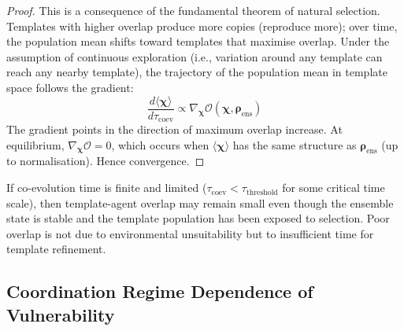 \documentclass[11pt,twocolumn,a4paper]{article}
\newcommand{\Template}{\boldsymbol{\chi}}
\newcommand{\State}{\boldsymbol{\rho}}
\newcommand{\Overlap}{\mathcal{O}}
\begin{document}
\begin{proof}
This is a consequence of the fundamental theorem of natural selection. Templates with higher overlap produce more copies (reproduce more); over time, the population mean shifts toward templates that maximise overlap. Under the assumption of continuous exploration (i.e., variation around any template can reach any nearby template), the trajectory of the population mean in template space follows the gradient:
\begin{equation}
\frac{d\langle \Template \rangle}{d\tau_{\mathrm{coev}}} \propto \nabla_{\Template} \Overlap(\Template, \State_{\mathrm{ens}})
\label{eq:coev_gradient}
\end{equation}
The gradient points in the direction of maximum overlap increase. At equilibrium, $\nabla_{\Template} \Overlap = 0$, which occurs when $\langle \Template \rangle$ has the same structure as $\State_{\mathrm{ens}}$ (up to normalisation). Hence convergence.
\end{proof}

\begin{corollary}
If co-evolution time is finite and limited ($\tau_{\mathrm{coev}} < \tau_{\mathrm{threshold}}$ for some critical time scale), then template-agent overlap may remain small even though the ensemble state is stable and the template population has been exposed to selection. Poor overlap is not due to environmental unsuitability but to insufficient time for template refinement.
\end{corollary}

\subsection{Coordination Regime Dependence of Vulnerability}
\end{document}
